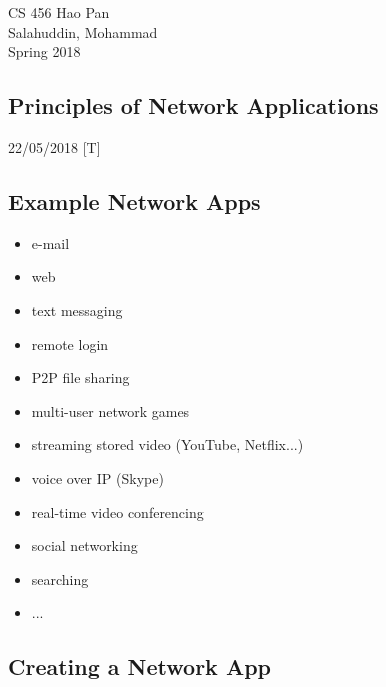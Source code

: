 \documentclass{article}
\begin{document}
\noindent
{CS 456 \hfill Hao Pan}\\
{Salahuddin, Mohammad}\\
{Spring 2018}


\begin{center}
\section{Principles of Network Applications}
\noindent
{\hfill 22/05/2018 [T]}
\end{center}

\subsection{Example Network Apps}

\begin{multicols}{2}
\begin{itemize}
\item e-mail
\item web
\item text messaging
\item remote login
\item P2P file sharing
\item multi-user network games
\columnbreak
\item streaming stored video (YouTube, Netflix...)
\item voice over IP (Skype)
\item real-time video conferencing
\item social networking
\item searching
\item ...
\end{itemize}
\end{multicols}

\subsection{Creating a Network App}
\end{document}

